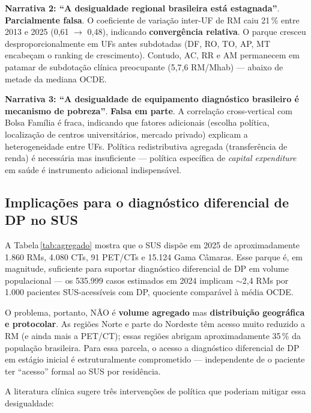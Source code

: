 \documentclass[12pt,a4paper,oneside]{article}
\begin{document}
\textbf{Narrativa 2: ``A desigualdade regional brasileira está
estagnada''}. \textbf{Parcialmente falsa}. O coeficiente de variação
inter-UF de RM caiu 21\,\% entre 2013 e 2025 (0,61 $\rightarrow$
0,48), indicando \textbf{convergência relativa}. O parque cresceu
desproporcionalmente em UFs antes subdotadas (DF, RO, TO, AP, MT
encabeçam o ranking de crescimento). Contudo, AC, RR e AM permanecem
em patamar de subdotação clínica preocupante (5,7,6
RM/Mhab) — abaixo de metade da mediana OCDE.

\textbf{Narrativa 3: ``A desigualdade de equipamento diagnóstico
brasileiro é mecanismo de pobreza''}. \textbf{Falsa em parte}. A
correlação cross-vertical com Bolsa Família é fraca, indicando que
fatores adicionais (escolha política, localização de centros
universitários, mercado privado) explicam a heterogeneidade entre
UFs. Política redistributiva agregada (transferência de renda) é
necessária mas insuficiente — política específica de
\textit{capital expenditure} em saúde é instrumento adicional
indispensável.

\subsection{Implicações para o diagnóstico diferencial de DP no SUS}

A Tabela\,\ref{tab:agregado} mostra que o SUS dispõe em 2025 de
aproximadamente 1.860 RMs, 4.080 CTs, 91 PET/CTs e 15.124 Gama
Câmaras. Esse parque é, em magnitude, suficiente para suportar
diagnóstico diferencial de DP em volume populacional — os 535.999
casos estimados em 2024 implicam $\sim$2,4 RMs por 1.000 pacientes
SUS-acessíveis com DP, quociente comparável à média OCDE.

O problema, portanto, NÃO é \textbf{volume agregado} mas
\textbf{distribuição geográfica e protocolar}. As regiões Norte e
parte do Nordeste têm acesso muito reduzido a RM (e ainda mais a
PET/CT); essas regiões abrigam aproximadamente 35\,\% da
população brasileira. Para essa parcela, o acesso a diagnóstico
diferencial de DP em estágio inicial é estrutural\-mente
comprometido — independente de o paciente ter ``acesso'' formal ao
SUS por residência.

A literatura clínica sugere três intervenções de política que
poderiam mitigar essa desigualdade:
\end{document}
